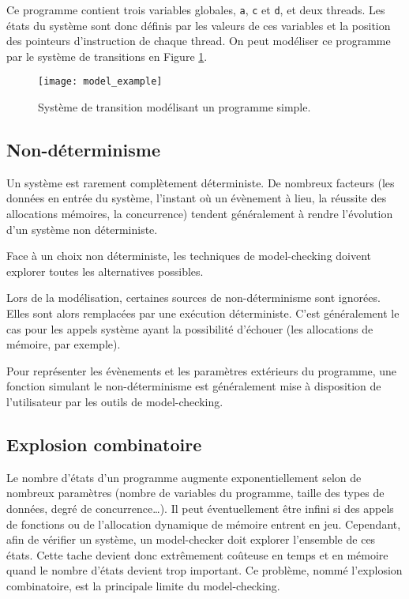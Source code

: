 Ce programme contient trois variables globales, \texttt{a}, \texttt{c} et
\texttt{d}, et deux threads. Les états du système sont donc définis par les
valeurs de ces variables et la position des pointeurs d'instruction de chaque
thread. On peut modéliser ce programme par le système de transitions en Figure
\ref{fig:model_example}.

\begin{figure}
\begin{center}
\texttt{[image: model\_example]}
\end{center}
\caption{Système de transition modélisant un programme simple.}
\label{fig:model_example}
\end{figure}

\subsection{Non-déterminisme}

Un système est rarement complètement déterministe. De nombreux facteurs (les
données en entrée du système, l'instant où un évènement à lieu, la réussite des
allocations mémoires, la concurrence) tendent généralement à rendre l'évolution
d'un système non déterministe.

Face à un choix non déterministe, les techniques de model-checking doivent
explorer toutes les alternatives possibles.

Lors de la modélisation, certaines sources de non-déterminisme sont ignorées.
Elles sont alors remplacées par une exécution déterministe.
C'est généralement le cas pour les appels système ayant la possibilité
d'échouer (les allocations de mémoire, par exemple).

Pour représenter les évènements et les paramètres extérieurs du programme,
une fonction simulant le non-déterminisme est généralement mise à disposition
de l'utilisateur par les outils de model-checking.

\subsection{Explosion combinatoire}

Le nombre d'états d'un programme augmente exponentiellement selon de nombreux
paramètres (nombre de variables du programme, taille des types de données, degré
de concurrence\dots). Il peut éventuellement être infini si des appels de
fonctions ou de l'allocation dynamique de mémoire entrent en jeu. Cependant, afin
de vérifier un système, un model-checker doit explorer l'ensemble de ces états.
Cette tache devient donc extrêmement coûteuse en temps et en mémoire quand le
nombre d'états devient trop important.
Ce problème, nommé l'explosion combinatoire, est la principale limite du
model-checking.

